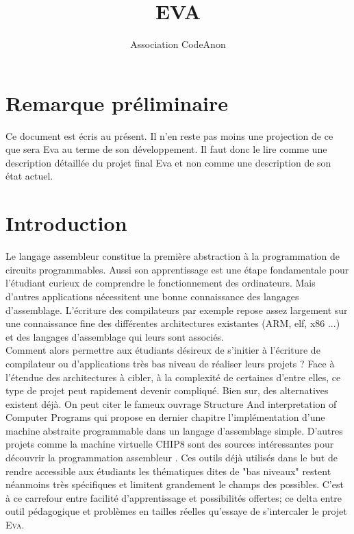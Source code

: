 \documentclass[11pt,twoside,french]{article}
\newcommand{\noun}[1]{\textsc{#1}}
\newcommand{\noun}[1]{\textsc{#1}}
\begin{document}
\title{EVA}
\author{Association CodeAnon}

\maketitle
\clearpage{}

\section*{Remarque préliminaire}

Ce document est écris au présent. Il n'en reste pas moins une projection de ce que sera Eva au terme de son développement. Il faut donc le lire comme une description détaillée du projet final Eva et non comme une description de son état actuel.

\cleardoublepage

\tableofcontents
\cleardoublepage

\vfill

\section{Introduction}

Le langage assembleur constitue la première abstraction à la programmation
de circuits programmables. Aussi son apprentissage est une étape fondamentale pour l'étudiant curieux de comprendre le fonctionnement des ordinateurs. Mais d'autres applications nécessitent une bonne connaissance des langages d'assemblage. L'écriture des compilateurs par exemple repose assez largement sur une connaissance fine des différentes architectures existantes (ARM, elf, x86 ...) et des langages d'assemblage qui leurs sont associés. \\

Comment alors permettre aux étudiants désireux de s'initier à l'écriture de compilateur ou d'applications très bas niveau de réaliser leurs projets ? Face à l'étendue des architectures à cibler, à la complexité de certaines d’entre elles, ce type de projet peut rapidement devenir compliqué. Bien sur, des alternatives existent déjà. On peut citer le fameux ouvrage Structure And interpretation of Computer Programs \cite{SICP} qui propose en dernier chapitre l'implémentation d'une machine abstraite programmable dans un langage d'assemblage simple. D'autres projets comme la machine virtuelle CHIP8 sont des sources intéressantes pour découvrir la programmation assembleur \cite{CHIP8}. Ces outils déjà utilisés dans le but de rendre accessible aux étudiants les thématiques dites de "bas niveaux" restent néanmoins très spécifiques et limitent grandement le champs des possibles. C'est à ce carrefour entre facilité d'apprentissage et possibilités offertes; ce delta entre outil pédagogique et problèmes en tailles réelles qu'essaye de s'intercaler le projet \noun{Eva}. \\
\end{document}
